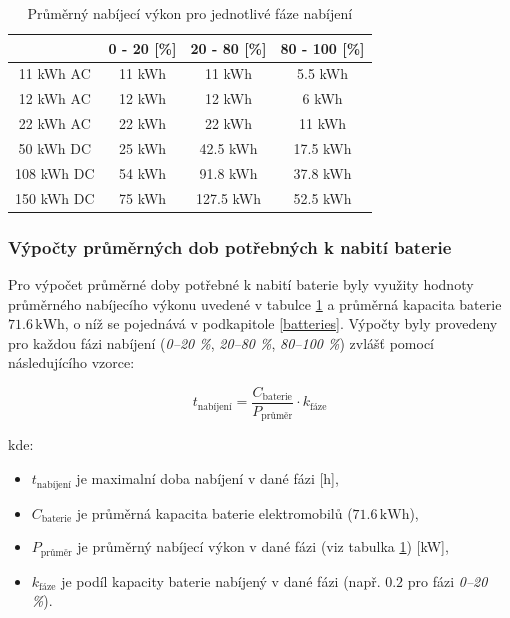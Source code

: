 \documentclass[a4paper,11pt]{article}
\begin{document}
\begin{table}[H]
    \centering 
    \vspace{0.5cm} %
    \begin{tabular}{|c|c|c|c|}
        \hline
        \textbf{} & \textbf{0 - 20 [\%]} & \textbf{20 - 80 [\%]} & \textbf{80 - 100 [\%]}\\
        \hline
        11 kWh AC  &  11 kWh  & 11 kWh & 5.5 kWh     \\
        \hline
        12 kWh AC  &  12 kWh  & 12 kWh & 6 kWh     \\
        \hline
        22 kWh AC  &  22 kWh  & 22 kWh & 11 kWh  \\
        \hline
        50 kWh DC  &  25 kWh  & 42.5 kWh & 17.5 kWh    \\
        \hline
        108 kWh DC &  54 kWh  & 91.8 kWh & 37.8 kWh \\
        \hline
        150 kWh DC &  75 kWh  & 127.5 kWh & 52.5 kWh \\
        \hline
    \end{tabular}
    \caption{Průměrný nabíjecí výkon pro jednotlivé fáze nabíjení}
    \label{table:average-charging-power}
    \vspace{0.5cm} %
\end{table}


\subsubsection{Výpočty průměrných dob potřebných k nabití baterie}

Pro výpočet průměrné doby potřebné k nabití baterie byly využity hodnoty průměrného nabíjecího výkonu uvedené v tabulce \ref{table:average-charging-power} a průměrná kapacita baterie \(71.6 \, \mathrm{kWh}\), o níž se pojednává v podkapitole \ref{batteries}. Výpočty byly provedeny pro každou fázi nabíjení (\textit{0–20 \%}, \textit{20–80 \%}, \textit{80–100 \%}) zvlášť pomocí následujícího vzorce:

\[
t_{\text{nabíjení}} = \frac{C_{\text{baterie}}}{P_{\text{průměr}}} \cdot k_{\text{fáze}}
\]

kde:
\begin{itemize}
    \item \(t_{\text{nabíjení}}\) je maximalní doba nabíjení v dané fázi [h],
    \item \(C_{\text{baterie}}\) je průměrná kapacita baterie elektromobilů (\(71.6 \, \mathrm{kWh}\)),
    \item \(P_{\text{průměr}}\) je průměrný nabíjecí výkon v dané fázi (viz tabulka \ref{table:average-charging-power}) [kW],
    \item \(k_{\text{fáze}}\) je podíl kapacity baterie nabíjený v dané fázi (např. \(0.2\) pro fázi \textit{0–20 \%}).\\
\end{itemize}
\end{document}
